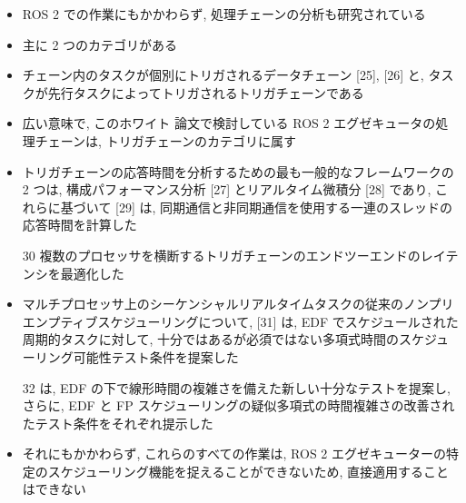 \begin{frame}{}
    \begin{itemize}
        \item ROS 2 での作業にもかかわらず, 処理チェーンの分析も研究されている
\item 主に 2 つのカテゴリがある
\item チェーン内のタスクが個別にトリガされるデータチェーン [25], [26] と, タスクが先行タスクによってトリガされるトリガチェーンである
\item 広い意味で, このホワイト 論文で検討している ROS 2 エグゼキュータの処理チェーンは, トリガチェーンのカテゴリに属す
\item トリガチェーンの応答時間を分析するための最も一般的なフレームワークの 2 つは, 構成パフォーマンス分析 [27] とリアルタイム微積分 [28] であり, これらに基づいて [29] は, 同期通信と非同期通信を使用する一連のスレッドの応答時間を計算した
\item [30] 複数のプロセッサを横断するトリガチェーンのエンドツーエンドのレイテンシを最適化した
\item マルチプロセッサ上のシーケンシャルリアルタイムタスクの従来のノンプリエンプティブスケジューリングについて, [31] は, EDF でスケジュールされた周期的タスクに対して, 十分ではあるが必須ではない多項式時間のスケジューリング可能性テスト条件を提案した
\item [32] は, EDF の下で線形時間の複雑さを備えた新しい十分なテストを提案し, さらに, EDF と FP スケジューリングの疑似多項式の時間複雑さの改善されたテスト条件をそれぞれ提示した
\item それにもかかわらず, これらのすべての作業は, ROS 2 エグゼキューターの特定のスケジューリング機能を捉えることができないため, 直接適用することはできない
    \end{itemize}
\end{frame}
